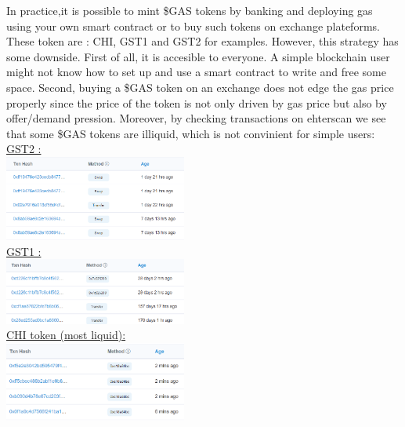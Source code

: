 In practice,it is possible to mint \$GAS tokens by banking and deploying gas using your own smart contract or to buy such tokens on exchange plateforms. These token are : CHI, GST1 and GST2 for examples. However, this strategy has some downside.
First of all, it is accesible to everyone. A simple blockchain user might not know how to set up and use a smart contract to write and free some space. 
Second, buying a \$GAS token on an exchange does not edge the gas price properly since the price of the token is not only driven by gas price but also by offer/demand pression. 
Moreover, by checking transactions on ehterscan we see that some \$GAS tokens are illiquid, which is not convinient for simple users:\\
\href{https://etherscan.io/address/0x0000000000004946c0e9f43f4dee607b0ef1fa1c}{GST2 :}\\
\includegraphics[width=0.45\textwidth]{figures/GST2 illiquidity.png}\\
\href{https://etherscan.io/token/0x88d60255f917e3eb94eae199d827dad837fac4cb}{GST1 : }\\
\includegraphics[width=0.45\textwidth]{figures/GST1 illiquidity.png}\\
\href{https://etherscan.io/token/0x0000000000004946c0e9f43f4dee607b0ef1fa1c}{CHI token (most liquid):}\\
\includegraphics[width=0.45\textwidth]{figures/CHI illiquidity.png}


